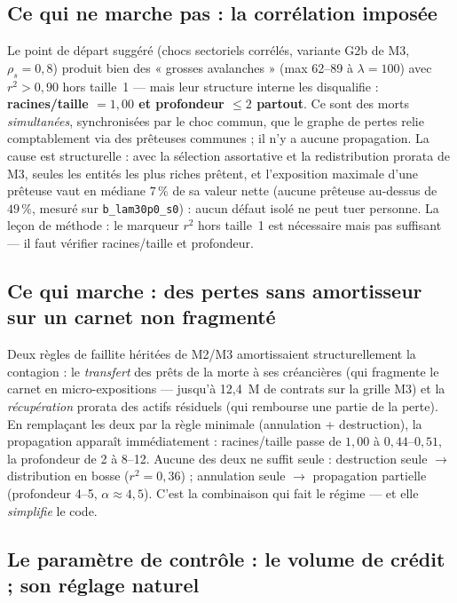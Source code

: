 \documentclass[11pt,a4paper]{article}
\newcommand{\code}[1]{\texttt{#1}}
\begin{document}
\subsection{Ce qui ne marche pas : la corrélation imposée}

Le point de départ suggéré (chocs sectoriels corrélés, variante G2b de M3,
$\rho_s = 0{,}8$) produit bien des « grosses avalanches » (max 62--89 à
$\lambda = 100$) avec $r^2 > 0{,}90$ hors taille~1 --- mais leur structure
interne les disqualifie : \textbf{racines/taille $= 1{,}00$ et profondeur
$\le 2$ partout}. Ce sont des morts \emph{simultanées}, synchronisées par le
choc commun, que le graphe de pertes relie comptablement via des prêteuses
communes ; il n'y a aucune propagation. La cause est structurelle : avec la
sélection assortative et la redistribution prorata de M3, seules les
entités les plus riches prêtent, et l'exposition maximale d'une prêteuse
vaut en médiane $7\,\%$ de sa valeur nette (aucune prêteuse au-dessus de
$49\,\%$, mesuré sur \code{b\_lam30p0\_s0}) : aucun défaut isolé ne peut
tuer personne. La leçon de méthode : le marqueur $r^2$ hors taille~1 est
nécessaire mais pas suffisant --- il faut vérifier racines/taille et
profondeur.

\subsection{Ce qui marche : des pertes sans amortisseur sur un carnet non fragmenté}

Deux règles de faillite héritées de M2/M3 amortissaient structurellement la
contagion : le \emph{transfert} des prêts de la morte à ses créancières
(qui fragmente le carnet en micro-expositions --- jusqu'à 12,4~M de contrats
sur la grille M3) et la \emph{récupération} prorata des actifs résiduels
(qui rembourse une partie de la perte). En remplaçant les deux par la règle
minimale (annulation + destruction), la propagation apparaît immédiatement :
racines/taille passe de $1{,}00$ à $0{,}44$--$0{,}51$, la profondeur de 2 à
8--12. Aucune des deux ne suffit seule : destruction seule $\to$ distribution
en bosse ($r^2 = 0{,}36$) ; annulation seule $\to$ propagation partielle
(profondeur 4--5, $\alpha \approx 4{,}5$). C'est la combinaison qui fait le
régime --- et elle \emph{simplifie} le code.

\subsection{Le paramètre de contrôle : le volume de crédit ; son réglage naturel}
\end{document}
